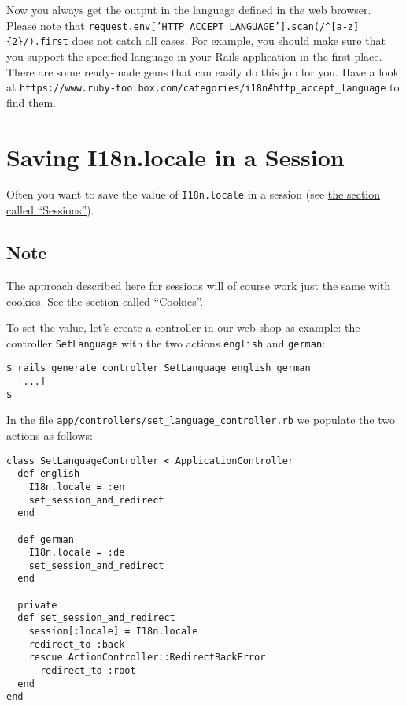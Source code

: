 \documentclass[a4paper]{book}
\newcommand{\chap}[1]{\newpage\thispagestyle{empty}\chapter{#1}\label{chap:\thechapter}}
\begin{document}
Now you always get the output in the language defined in the web browser. Please note that \texttt{request.env{[}'HTTP\_ACCEPT\_LANGUAGE'{]}.scan(/\^{}{[}a-z{]}\{2\}/).first} does not catch all cases. For example, you should make sure that you support the specified language in your Rails application in the first place. There are some ready-made gems that can easily do this job for you. Have a look at \texttt{https://www.ruby-toolbox.com/categories/i18n\#http\_accept\_language} to find them.

\chap{Saving I18n.locale in a Session}\label{saving-i18n.locale-in-a-session}

Often you want to save the value of \texttt{I18n.locale} in a session (see \hyperref[sessions]{the section called “Sessions”}).

\section{Note}\label{note-48}

The approach described here for sessions will of course work just the same with cookies. See \hyperref[cookies]{the section called “Cookies”}.

To set the value, let's create a controller in our web shop as example: the controller \texttt{SetLanguage} with the two actions \texttt{english} and \texttt{german}:

\begin{shaded}\begin{verbatim}
$ rails generate controller SetLanguage english german
  [...]
$
\end{verbatim}\end{shaded}

In the file \texttt{app/controllers/set\_language\_controller.rb} we populate the two actions as follows:

\begin{shaded}\begin{verbatim}
class SetLanguageController < ApplicationController
  def english
    I18n.locale = :en
    set_session_and_redirect
  end

  def german
    I18n.locale = :de
    set_session_and_redirect
  end

  private
  def set_session_and_redirect
    session[:locale] = I18n.locale
    redirect_to :back
    rescue ActionController::RedirectBackError
      redirect_to :root
  end
end
\end{verbatim}\end{shaded}
\end{document}

